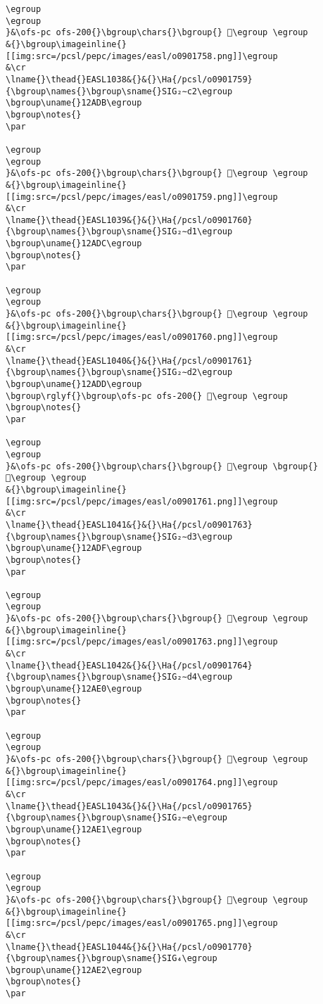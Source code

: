 \begin{verbatim}
\egroup
\egroup
}&\ofs-pc ofs-200{}\bgroup\chars{}\bgroup{} 𒫚\egroup \egroup
&{}\bgroup\imageinline{}[[img:src=/pcsl/pepc/images/easl/o0901758.png]]\egroup
&\cr
\lname{}\thead{}EASL1038&{}&{}\Ha{/pcsl/o0901759}{\bgroup\names{}\bgroup\sname{}SIG₂∼c2\egroup
\bgroup\uname{}12ADB\egroup
\bgroup\notes{}
\par 

\egroup
\egroup
}&\ofs-pc ofs-200{}\bgroup\chars{}\bgroup{} 𒫛\egroup \egroup
&{}\bgroup\imageinline{}[[img:src=/pcsl/pepc/images/easl/o0901759.png]]\egroup
&\cr
\lname{}\thead{}EASL1039&{}&{}\Ha{/pcsl/o0901760}{\bgroup\names{}\bgroup\sname{}SIG₂∼d1\egroup
\bgroup\uname{}12ADC\egroup
\bgroup\notes{}
\par 

\egroup
\egroup
}&\ofs-pc ofs-200{}\bgroup\chars{}\bgroup{} 𒫜\egroup \egroup
&{}\bgroup\imageinline{}[[img:src=/pcsl/pepc/images/easl/o0901760.png]]\egroup
&\cr
\lname{}\thead{}EASL1040&{}&{}\Ha{/pcsl/o0901761}{\bgroup\names{}\bgroup\sname{}SIG₂∼d2\egroup
\bgroup\uname{}12ADD\egroup
\bgroup\rglyf{}\bgroup\ofs-pc ofs-200{} 𒫝\egroup \egroup
\bgroup\notes{}
\par 

\egroup
\egroup
}&\ofs-pc ofs-200{}\bgroup\chars{}\bgroup{} 𒫝\egroup \bgroup{} 𒫞\egroup \egroup
&{}\bgroup\imageinline{}[[img:src=/pcsl/pepc/images/easl/o0901761.png]]\egroup
&\cr
\lname{}\thead{}EASL1041&{}&{}\Ha{/pcsl/o0901763}{\bgroup\names{}\bgroup\sname{}SIG₂∼d3\egroup
\bgroup\uname{}12ADF\egroup
\bgroup\notes{}
\par 

\egroup
\egroup
}&\ofs-pc ofs-200{}\bgroup\chars{}\bgroup{} 𒫟\egroup \egroup
&{}\bgroup\imageinline{}[[img:src=/pcsl/pepc/images/easl/o0901763.png]]\egroup
&\cr
\lname{}\thead{}EASL1042&{}&{}\Ha{/pcsl/o0901764}{\bgroup\names{}\bgroup\sname{}SIG₂∼d4\egroup
\bgroup\uname{}12AE0\egroup
\bgroup\notes{}
\par 

\egroup
\egroup
}&\ofs-pc ofs-200{}\bgroup\chars{}\bgroup{} 𒫠\egroup \egroup
&{}\bgroup\imageinline{}[[img:src=/pcsl/pepc/images/easl/o0901764.png]]\egroup
&\cr
\lname{}\thead{}EASL1043&{}&{}\Ha{/pcsl/o0901765}{\bgroup\names{}\bgroup\sname{}SIG₂∼e\egroup
\bgroup\uname{}12AE1\egroup
\bgroup\notes{}
\par 

\egroup
\egroup
}&\ofs-pc ofs-200{}\bgroup\chars{}\bgroup{} 𒫡\egroup \egroup
&{}\bgroup\imageinline{}[[img:src=/pcsl/pepc/images/easl/o0901765.png]]\egroup
&\cr
\lname{}\thead{}EASL1044&{}&{}\Ha{/pcsl/o0901770}{\bgroup\names{}\bgroup\sname{}SIG₄\egroup
\bgroup\uname{}12AE2\egroup
\bgroup\notes{}
\par 


\end{verbatim}
